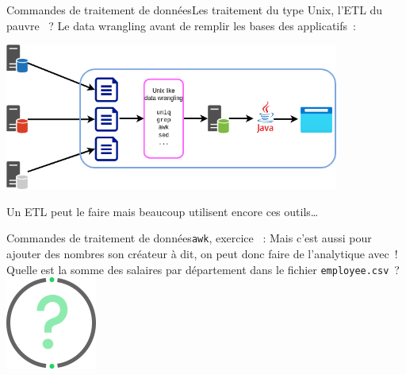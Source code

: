 \documentclass{beamer}
\begin{document}
    \begin{frame}{Commandes de traitement de données}{Les traitement du type Unix, l'ETL du pauvre ~?}
        Le data wrangling avant de remplir les bases des applicatifs~:
        \begin{center}
            \includegraphics[width=11cm]{image/pre-traitement-unix.drawio}
        \end{center}
        Un ETL peut le faire mais beaucoup utilisent encore ces outils\ldots
    \end{frame}

    \begin{frame}{Commandes de traitement de données}{\lstinline{awk}, exercice \execcounterdispinc{}~:}
        Mais c'est aussi pour ajouter des nombres son créateur à dit, on peut donc faire de l'analytique avec~!
        \bigbreak
        Quelle est la somme des salaires par département dans le fichier \lstinline{employee.csv}~?
        \bigbreak
        \centering
        \includegraphics[width=3cm]{image/question-mark}
    \end{frame}
\end{document}
